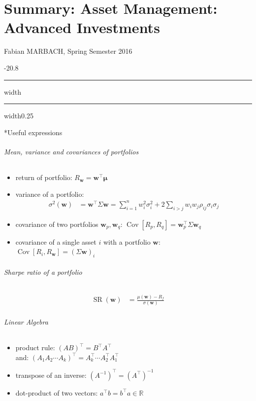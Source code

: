 \documentclass[a4paper,landscape,8pt,fleqn]{scrartcl}
\makeatletter
\newcommand{\SummaryTitle}{Asset Management: Advanced Investments}
\newcommand{\SummaryAuthor}{Fabian MARBACH}
\newcommand{\SummarySemester}{Spring Semester 2016}
\renewcommand{\section}{\@startsection{section}{1}{0mm}%
{-2\baselineskip}{0.8\baselineskip}%
{\hrule depth 0.2pt width\columnwidth\hrule depth1.5pt
width0.25\columnwidth\vspace*{1.2em}\Large\bfseries}}
\DeclareMathOperator{\Cov}{Cov}				%
\DeclareMathOperator{\SR}{SR}					%
\makeatother
\begin{document}
\part*{Summary: \SummaryTitle}
\SummaryAuthor, \SummarySemester
\begin{multicols*}{3}
\raggedcolumns
\newpage

\section*{Useful expressions}

\paragraph{Mean, variance and covariances of portfolios}
\begin{itemize}
\item return of portfolio: $R_{\bm w} = \bm w^\top \bm \mu$
\item variance of a portfolio:
\begin{align*}
\sigma^2(\bm w) &= \bm w^\top \Sigma \bm w = \sum_{i=1}^n w_i^2 \sigma_i^2 + 2 \sum_{i > j} w_i w_j \rho_{ij} \sigma_i \sigma_j
\end{align*}
\item covariance of two portfolios $\bm w_p, \bm w_q$: $\Cov[R_p, R_q] = \bm w_p^\top \Sigma \bm w_q$
\item covariance of a single asset $i$ with a portfolio $\bm w$: \\
$\Cov[R_i, R_{\bm w}] = (\Sigma \bm w)_i$
\end{itemize}

\paragraph{Sharpe ratio of a portfolio}
\begin{align*}
\SR(\bm w) &= \frac{\mu(\bm w) - R_f}{\sigma(\bm w)}
\end{align*}

\paragraph{Linear Algebra}
\begin{itemize}
\item product rule: $(A B)^\top = B^\top A^\top$ \\
and: $(A_1 A_2 \cdots A_k)^\top = A_k^\top \cdots A_2^\top A_1^\top$
\item transpose of an inverse: $(A^{-1})^\top = (A^\top)^{-1}$
\item dot-product of two vectors: $a^\top b = b^\top a \in \mathbb{R}$
\end{itemize}


\end{multicols*}
\end{document}
